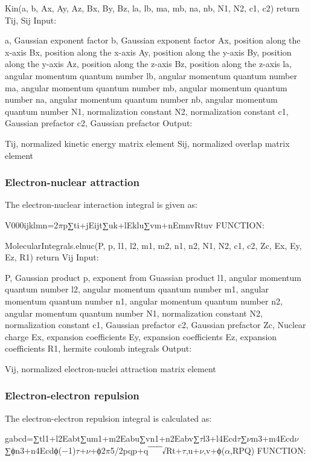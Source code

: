 \documentclass[letterpaper,10pt,english]{sphinxmanual}
\begin{document}
Kin(a, b, Ax, Ay, Az, Bx, By, Bz, la, lb, ma, mb, na, nb, N1, N2, c1, c2)
return Tij, Sij
Input:

a, Gaussian exponent factor
b, Gaussian exponent factor
Ax, position along the x-axis
Bx, position along the x-axis
Ay, position along the y-axis
By, position along the y-axis
Az, position along the z-axis
Bz, position along the z-axis
la, angular momentum quantum number
lb, angular momentum quantum number
ma, angular momentum quantum number
mb, angular momentum quantum number
na, angular momentum quantum number
nb, angular momentum quantum number
N1, normalization constant
N2, normalization constant
c1, Gaussian prefactor
c2, Gaussian prefactor
Output:

Tij, normalized kinetic energy matrix element
Sij, normalized overlap matrix element


\subsubsection{Electron-nuclear attraction}
\label{\detokenize{user_molecular_system:electron-nuclear-attraction}}
The electron-nuclear interaction integral is given as:

V000ijklmn=2\(\pi\)p∑ti+jEijt∑uk+lEklu∑vm+nEmnvRtuv
FUNCTION:

MolecularIntegrals.elnuc(P, p, l1, l2, m1, m2, n1, n2, N1, N2, c1, c2, Zc, Ex, Ey, Ez, R1)
return Vij
Input:

P, Gaussian product
p, exponent from Guassian product
l1, angular momentum quantum number
l2, angular momentum quantum number
m1, angular momentum quantum number
n1, angular momentum quantum number
n2, angular momentum quantum number
N1, normalization constant
N2, normalization constant
c1, Gaussian prefactor
c2, Gaussian prefactor
Zc, Nuclear charge
Ex, expansion coefficients
Ey, expansion coefficients
Ez, expansion coefficients
R1, hermite coulomb integrals
Output:

Vij, normalized electron-nuclei attraction matrix element


\subsubsection{Electron-electron repulsion}
\label{\detokenize{user_molecular_system:electron-electron-repulsion}}
The electron-electron repulsion integral is calculated as:

gabcd=∑tl1+l2Eabt∑um1+m2Eabu∑vn1+n2Eabv∑\(\tau\)l3+l4Ecd\(\tau\)∑\(\nu\)m3+m4Ecd\(\nu\)∑ϕn3+n4Ecdϕ(−1)\(\tau\)+\(\nu\)+ϕ2\(\pi\)5/2pqp+q‾‾‾‾‾√Rt+\(\tau\),u+\(\nu\),v+ϕ(\(\alpha\),RPQ)
FUNCTION:
\end{document}
